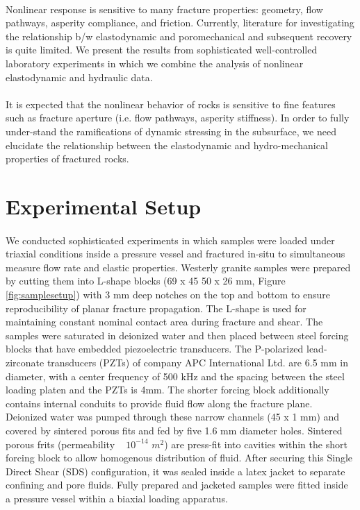 \documentclass[letterpaper,10pt]{article}
\begin{document}
\paragraph{} Nonlinear response is sensitive to many fracture properties: geometry, flow pathways, asperity compliance, and friction. Currently, literature for investigating the relationship b/w elastodynamic and poromechanical and subsequent recovery is quite limited. We present the results from sophisticated well-controlled laboratory experiments in which we combine the analysis of nonlinear elastodynamic and hydraulic data. 

\paragraph{} It is expected that the nonlinear behavior of rocks is sensitive to fine features such as fracture aperture (i.e. flow pathways, asperity stiffness). In order to fully under-stand the ramifications of dynamic stressing in the subsurface, we need elucidate the relationship between the elastodynamic and hydro-mechanical properties of fractured rocks. 



\section{Experimental Setup}
\label{sec:experimnt_setup}

\paragraph{} We conducted sophisticated experiments in which samples were loaded under triaxial conditions inside a pressure vessel and fractured in-situ to simultaneous measure flow rate and elastic properties. Westerly granite samples were prepared by cutting them into L-shape blocks (69 x 45 50 x 26 mm, Figure \ref{fig:samplesetup}) with 3 mm deep notches on the top and bottom to ensure reproducibility of planar fracture propagation. The L-shape is used for maintaining constant nominal contact area during fracture and shear. The samples were saturated in deionized water and then placed between steel forcing blocks that have embedded piezoelectric transducers. The P-polarized lead-zirconate transducers (PZTs) of company APC International Ltd. are 6.5 mm in diameter, with a center frequency of 500 kHz and the spacing between the steel loading platen and the PZTs is 4mm. The shorter forcing block additionally contains internal conduits to provide fluid flow along the fracture plane. Deionized water was pumped through these narrow channels (45 x 1 mm) and covered by sintered porous fits and fed by five 1.6 mm diameter holes. Sintered porous frits (permeability ~ $10^{-14}$ $m^2$) are press-fit into cavities within the short forcing block to allow homogenous distribution of fluid. After securing this Single Direct Shear (SDS) configuration, it was sealed inside a latex jacket to separate confining and pore fluids. Fully prepared and jacketed samples were fitted inside a pressure vessel within a biaxial loading apparatus.
\end{document}
